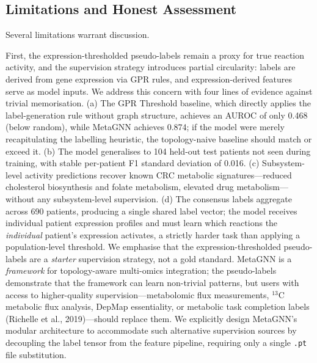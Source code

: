 \documentclass[12pt,a4paper]{article}
\begin{document}
\subsection{Limitations and Honest Assessment}

Several limitations warrant discussion.

First, the expression-thresholded pseudo-labels remain a proxy for true reaction activity, and the supervision strategy introduces partial circularity: labels are derived from gene expression via GPR rules, and expression-derived features serve as model inputs. We address this concern with four lines of evidence against trivial memorisation. (a) The GPR Threshold baseline, which directly applies the label-generation rule without graph structure, achieves an AUROC of only 0.468 (below random), while MetaGNN achieves 0.874; if the model were merely recapitulating the labelling heuristic, the topology-naive baseline should match or exceed it. (b) The model generalises to 104 held-out test patients not seen during training, with stable per-patient F1 standard deviation of 0.016. (c) Subsystem-level activity predictions recover known CRC metabolic signatures---reduced cholesterol biosynthesis and folate metabolism, elevated drug metabolism---without any subsystem-level supervision. (d) The consensus labels aggregate across 690 patients, producing a single shared label vector; the model receives individual patient expression profiles and must learn which reactions the \textit{individual} patient's expression activates, a strictly harder task than applying a population-level threshold. We emphasise that the expression-thresholded pseudo-labels are a \textit{starter} supervision strategy, not a gold standard. MetaGNN is a \textit{framework} for topology-aware multi-omics integration; the pseudo-labels demonstrate that the framework can learn non-trivial patterns, but users with access to higher-quality supervision---metabolomic flux measurements, $^{13}$C metabolic flux analysis, DepMap essentiality, or metabolic task completion labels (Richelle et al., 2019)---should replace them. We explicitly design MetaGNN's modular architecture to accommodate such alternative supervision sources by decoupling the label tensor from the feature pipeline, requiring only a single \texttt{.pt} file substitution.
\end{document}
